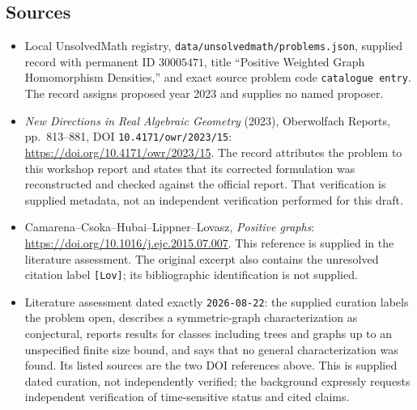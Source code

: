 \documentclass[11pt]{article}
\begin{document}
\subsection{Sources}
\begin{itemize}
\item Local UnsolvedMath registry, \texttt{data/unsolvedmath/problems.json}, supplied record with permanent ID \(30005471\), title ``Positive Weighted Graph Homomorphism Densities,'' and exact source problem code \texttt{catalogue entry}. The record assigns proposed year 2023 and supplies no named proposer.
\item \emph{New Directions in Real Algebraic Geometry} (2023), Oberwolfach Reports, pp.\ 813--881, DOI \texttt{10.4171/owr/2023/15}: \url{https://doi.org/10.4171/owr/2023/15}. The record attributes the problem to this workshop report and states that its corrected formulation was reconstructed and checked against the official report. That verification is supplied metadata, not an independent verification performed for this draft.
\item Camarena--Csoka--Hubai--Lippner--Lovasz, \emph{Positive graphs}: \url{https://doi.org/10.1016/j.ejc.2015.07.007}. This reference is supplied in the literature assessment. The original excerpt also contains the unresolved citation label \texttt{[Lov]}; its bibliographic identification is not supplied.
\item Literature assessment dated exactly \texttt{2026-08-22}: the supplied curation labels the problem open, describes a symmetric-graph characterization as conjectural, reports results for classes including trees and graphs up to an unspecified finite size bound, and says that no general characterization was found. Its listed sources are the two DOI references above. This is supplied dated curation, not independently verified; the background expressly requests independent verification of time-sensitive status and cited claims.
\end{itemize}
\end{document}
